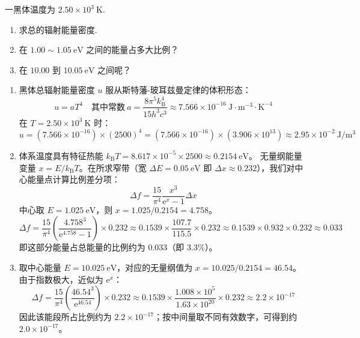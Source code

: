 \begin{exercise}\label{ex:27.13}
一黑体温度为 $2.50 \times 10^3 \ \mathrm{K}$. 
\begin{enumerate}
  \item[(a)] 求总的辐射能量密度. 
  \item[(b)] 在 $1.00 \sim 1.05 \ \mathrm{eV}$ 之间的能量占多大比例？
  \item[(c)] 在 $10.00$ 到 $10.05 \ \mathrm{eV}$ 之间呢？
\end{enumerate}
\end{exercise}
\begin{solution}
\begin{enumerate}
    \item[(a)] 黑体总辐射能量密度 $u$ 服从斯特藩-玻耳兹曼定律的体积形态：
    $$ u = a T^4 \quad \text{其中常数} \ a = \frac{8\pi^5 k_{\mathrm{B}}^4}{15 h^3 c^3} \approx 7.566 \times 10^{-16} \ \mathrm{J \cdot m^{-3} \cdot K^{-4}} $$
    在 $T = 2.50 \times 10^3 \ \mathrm{K}$ 时：
    $$ u = (7.566 \times 10^{-16}) \times (2500)^4 = (7.566 \times 10^{-16}) \times (3.906 \times 10^{13}) \approx 2.95 \times 10^{-2} \ \mathrm{J/m^3} $$
    \item[(b)] 体系温度具有特征热能 $k_{\mathrm{B}} T = 8.617 \times 10^{-5} \times 2500 \approx 0.2154 \ \mathrm{eV}$。
    无量纲能量变量 $x = E / k_{\mathrm{B}} T$。在所求窄带（宽 $\Delta E = 0.05 \ \mathrm{eV}$ 即 $\Delta x \approx 0.232$），我们对中心能量点计算比例差分项：
    $$ \Delta f = \frac{15}{\pi^4} \frac{x^3}{\mathrm{e}^x - 1} \Delta x $$
    中心取 $E = 1.025 \ \mathrm{eV}$，则 $x = 1.025 / 0.2154 = 4.758$。
    $$ \Delta f = \frac{15}{\pi^4} \left( \frac{4.758^3}{\mathrm{e}^{4.758} - 1} \right) \times 0.232 \approx 0.1539 \times \frac{107.7}{115.5} \times 0.232 \approx 0.1539 \times 0.932 \times 0.232 \approx 0.033 $$
    即这部分能量占总能量的比例约为 $0.033$（即 $3.3\%$）。

    \item[(c)] 取中心能量 $E = 10.025 \ \mathrm{eV}$，对应的无量纲值为 $x = 10.025 / 0.2154 = 46.54$。由于指数极大，近似为 $\mathrm{e}^x$：
    $$ \Delta f = \frac{15}{\pi^4} \left( \frac{46.54^3}{\mathrm{e}^{46.54}} \right) \times 0.232 \approx 0.1539 \times \frac{1.008 \times 10^5}{1.63 \times 10^{20}} \times 0.232 \approx 2.2 \times 10^{-17} $$
    因此该能段所占比例约为 $2.2\times10^{-17}$；按中间量取不同有效数字，可得到约 $2.0\times10^{-17}$。
\end{enumerate}
\end{solution}

